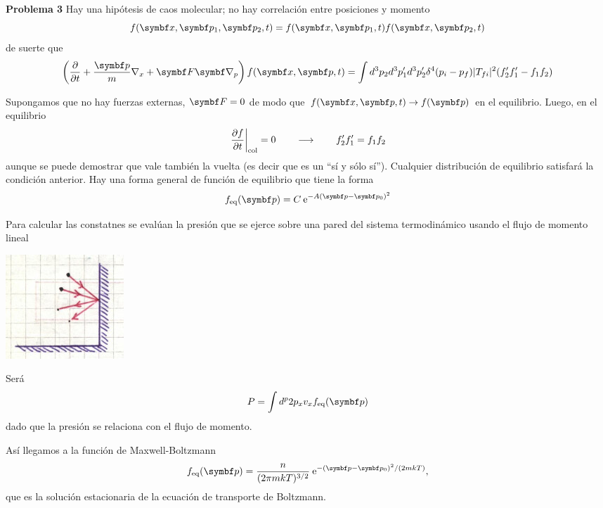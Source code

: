 \documentclass[10pt,oneside]{CBFT_book}
\begin{document}
\begin{ejemplo}{\bf Problema 3}
Hay una hipótesis de caos molecular; no hay correlación entre posiciones y momento
\[
	f(\vbx,\vbp_1,\vbp_2,t) = f(\vbx,\vbp_1,t) f(\vbx,\vbp_2,t) 
\]
de suerte que
\[
	\left( \dpar{}{t} + \frac{\vbp}{m} \nabla_x + \vb{F}\Nabla_p \right) f(\vbx,\vbp,t) =
	\int d^3p_2 d^3p_1' d^3p_2' \delta^4(p_i-p_f) |T_{fi}|^2 (f_2' f_1' -  f_1 f_2)
\]

Supongamos que no hay fuerzas externas, $\vb{F}=0$ de modo que $ f(\vbx,\vbp,t)\to f(\vbp)$ en el equilibrio.
Luego, en el equilibrio
\[
	\left.\frac{\partial^{\hspace{-0.05em}} {f}}{\partial {t}^{\hspace{-0.05em}}}\right|_\text{col} = 0 \qquad \longrightarrow \qquad  f_2' f_1' =  f_1 f_2
\]
aunque se puede demostrar que vale también la vuelta (es decir que es un ``sí y sólo sí'').
Cualquier distribución de equilibrio satisfará la condición anterior. Hay una forma general de 
función de equilibrio que tiene la forma
\[
	f_\text{eq}(\vbp) = C \euler^{- A(\vbp - \vbp_0)^2}
\]

Para calcular las constatnes se evalúan la presión que se ejerce sobre una pared del sistema termodinámico
usando el flujo de momento lineal


\includegraphics[scale=0.5]{images/1606329297.jpg}

Será
\[
	P = \int d^p 2 p_x v_x f_\text{eq}(\vbp)
\]
dado que la presión se relaciona con el flujo de momento.

Así llegamos a la función de Maxwell-Boltzmann
\[
	f_\text{eq}(\vbp) = \frac{ n }{( 2 \pi m k T )^{3/2}} \euler^{- (\vbp - \vbp_0)^2 / (2mkT)},
\]
que es la solución estacionaria de la ecuación de transporte de Boltzmann.
 
\end{ejemplo}
\end{document}

